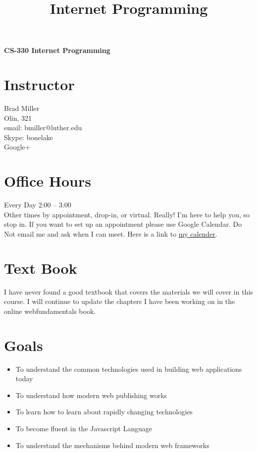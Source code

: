 \documentclass[11pt,twocolumn]{article}
\title{Internet Programming}
\author{}
\begin{document}
\begin{center}
	{\sffamily\LARGE\bfseries CS-330 Internet Programming}
\end{center}

\section*{Instructor}
Brad Miller \\
Olin, 321 \\
email:  bmiller@luther.edu \\
Skype:  bonelake \\
Google+ \\

\section*{Office Hours}
Every Day 2:00 -- 3:00   \\
Other times by appointment, drop-in, or virtual.  Really! I'm here to help you, so stop in.  If you want to set up an appointment please use Google Calendar.  Do Not email me and ask when I can meet.  Here is a link to \href{https://calendar.google.com/calendar/embed?src=millbr02%40luther.edu&ctz=America/Chicago}{\underline{my calender}}.

\section*{Text Book}

I have never found a good textbook that covers the materials we will cover in this course.  I will continue to update the chapters I have been working on in the online webfundamentals book.

\section*{Goals}

\begin{itemize}
    \item To understand the common technologies used in building web applications today
    \item To understand how modern web publishing works
    \item To learn how to learn about rapidly changing technologies
    \item To become fluent in the Javascript Language
    \item To understand the mechanisms behind modern web frameworks
\end{itemize}
\end{document}

